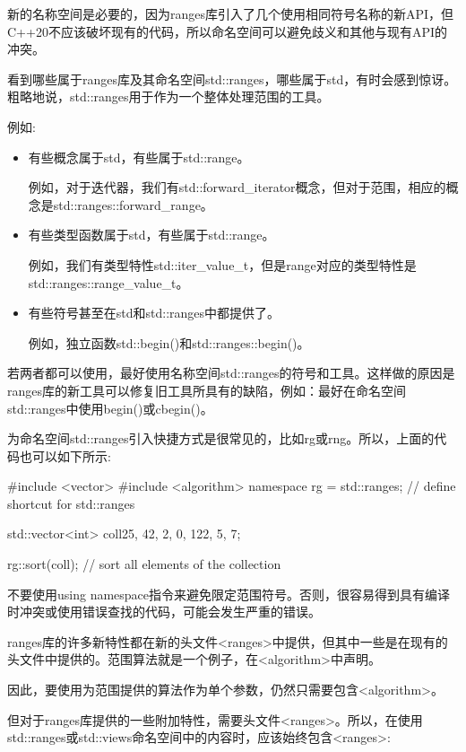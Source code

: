 新的名称空间是必要的，因为ranges库引入了几个使用相同符号名称的新API，但C++20不应该破坏现有的代码，所以命名空间可以避免歧义和其他与现有API的冲突。

看到哪些属于ranges库及其命名空间std::ranges，哪些属于std，有时会感到惊讶。粗略地说，std::ranges用于作为一个整体处理范围的工具。

例如:

\begin{itemize}
\item
有些概念属于std，有些属于std::range。

例如，对于迭代器，我们有std::forward\_iterator概念，但对于范围，相应的概念是std::ranges::forward\_range。

\item
有些类型函数属于std，有些属于std::range。

例如，我们有类型特性std::iter\_value\_t，但是range对应的类型特性是std::ranges::range\_value\_t。

\item
有些符号甚至在std和std::ranges中都提供了。

例如，独立函数std::begin()和std::ranges::begin()。
\end{itemize}

若两者都可以使用，最好使用名称空间std::ranges的符号和工具。这样做的原因是ranges库的新工具可以修复旧工具所具有的缺陷，例如：最好在命名空间std::ranges中使用begin()或cbegin()。

为命名空间std::ranges引入快捷方式是很常见的，比如rg或rng。所以，上面的代码也可以如下所示:

\begin{cpp}
#include <vector>
#include <algorithm>
namespace rg = std::ranges; // define shortcut for std::ranges

std::vector<int> coll{25, 42, 2, 0, 122, 5, 7};

rg::sort(coll); // sort all elements of the collection
\end{cpp}

不要使用using namespace指令来避免限定范围符号。否则，很容易得到具有编译时冲突或使用错误查找的代码，可能会发生严重的错误。


ranges库的许多新特性都在新的头文件<ranges>中提供，但其中一些是在现有的头文件中提供的。范围算法就是一个例子，在<algorithm>中声明。

因此，要使用为范围提供的算法作为单个参数，仍然只需要包含<algorithm>。

但对于ranges库提供的一些附加特性，需要头文件<ranges>。所以，在使用std::ranges或std::views命名空间中的内容时，应该始终包含<ranges>:

